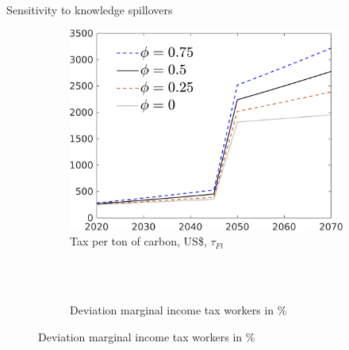 \documentclass[11pt,aspectratio=169]{beamer}
\begin{document}
\begin{frame}{Sensitivity to knowledge spillovers}
	\hypertarget{sensphi}{}
	\vspace{-3mm}
	\begin{figure}[h!!]
		
		\begin{subfigure}{0.45\textwidth}		
			\caption{Tax per ton of carbon,  US\$, $\tau_{Ft}$\\ \ }
			\includegraphics[width=1\textwidth]{../codding_model/own_basedOnFried/optimalPol_010922_revision/figures/all_13Sept22/Phi_SensN_Tauf_spillover0_knspil0_xgr0_nsk0_sep0_extern0_PV1_etaa0.79_lgd1.png}
		\end{subfigure}	
		\begin{minipage}[]{0.05\textwidth}
			\ 
		\end{minipage}
		\begin{subfigure}{0.42\textwidth}		
			\caption{ Deviation marginal income tax workers in \%}

\end{subfigure}
\end{figure}
\end{frame}
\end{document}
